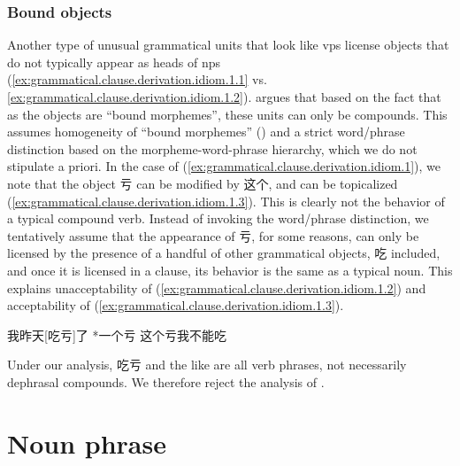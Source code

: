 \documentclass[UTF8, a4paper, oneside, scheme=plain, 12pt]{ctexrep}
\newcommand*{\citepage}[1]{p.~{#1}}
\begin{document}
\subsubsection{Bound objects}\label{sec:grammatical.clause.core-vp.derivation.object-bound}

Another type of unusual grammatical units that look like \acp{vp} 
license objects that do not typically appear as heads of \acp{np}
(\ref{ex:grammatical.clause.derivation.idiom.1.1} vs. \ref{ex:grammatical.clause.derivation.idiom.1.2}).
\citet[\citepage{129}]{zhudexigrammar} argues that based on the fact that 
as the objects are ``bound morphemes'', these units can only be compounds.
This assumes homogeneity of ``bound morphemes'' ()
and a strict word/phrase distinction based on the morpheme-word-phrase hierarchy,
which we do not stipulate a priori.
In the case of (\ref{ex:grammatical.clause.derivation.idiom.1}),
we note that the object 亏 can be modified by 这个,
and can be topicalized (\ref{ex:grammatical.clause.derivation.idiom.1.3}).
This is clearly not the behavior of a typical compound verb.
Instead of invoking the word/phrase distinction,
we tentatively assume that the appearance of 亏,
for some reasons, can only be licensed by the presence of a handful of other grammatical objects,
吃 included, and once it is licensed in a clause,
its behavior is the same as a typical noun.
This explains unacceptability of (\ref{ex:grammatical.clause.derivation.idiom.1.2})
and acceptability of (\ref{ex:grammatical.clause.derivation.idiom.1.3}).

\begin{exe}
    \ex\label{ex:grammatical.clause.derivation.idiom.1} \begin{xlist}
        \ex\label{ex:grammatical.clause.derivation.idiom.1.1} 我昨天[吃亏]了
        \ex\label{ex:grammatical.clause.derivation.idiom.1.2} *一个亏
        \ex\label{ex:grammatical.clause.derivation.idiom.1.3} 这个亏我不能吃
    \end{xlist}
\end{exe}

Under our analysis, 吃亏 and the like are all verb phrases,
not necessarily dephrasal compounds.
We therefore reject the analysis of \citet[\citepage{129}]{zhudexigrammar}.

\section{Noun phrase}\label{sec:grammatical.np}
\end{document}
